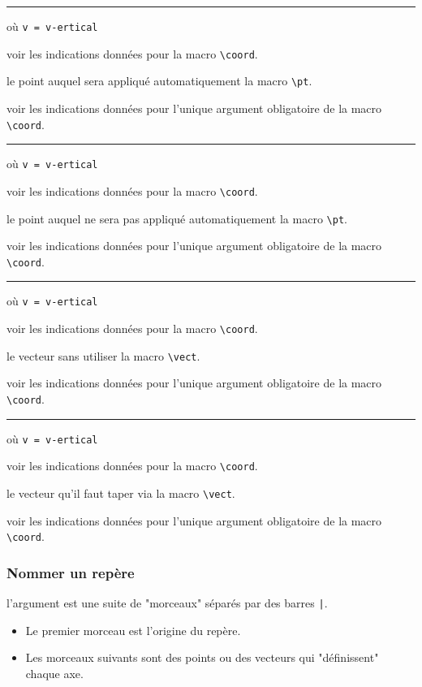 \documentclass[12pt,a4paper]{article}
\newcommand\env[1]{\texttt{#1}}
\newcommand\macro[1]{\env{\textbackslash{}#1}}
\theoremstyle{definition}
\newcommand\separation{
	\medskip
	\hfill\rule{0.5\textwidth}{0.75pt}\hfill
	\medskip
}
\newcommand\mwhyprefix[2]{%
	\texttt{#1 = #1-#2}%
}
\begin{document}
\separation


 où \quad \mwhyprefix{v}{ertical}

\IDoption{} voir les indications données pour la macro \macro{coord}.

 le point auquel sera appliqué automatiquement la macro \macro{pt}.

 voir les indications données pour l'unique argument obligatoire de la macro \macro{coord}.


\separation


 où \quad \mwhyprefix{v}{ertical}

\IDoption{} voir les indications données pour la macro \macro{coord}.

 le point auquel ne sera pas appliqué automatiquement la macro \macro{pt}.

 voir les indications données pour l'unique argument obligatoire de la macro \macro{coord}.


\separation


 où \quad \mwhyprefix{v}{ertical}

\IDoption{} voir les indications données pour la macro \macro{coord}.

 le vecteur sans utiliser la macro \macro{vect}.

 voir les indications données pour l'unique argument obligatoire de la macro \macro{coord}.


\separation


 où \quad \mwhyprefix{v}{ertical}

\IDoption{} voir les indications données pour la macro \macro{coord}.

 le vecteur qu'il faut taper via la macro \macro{vect}.

 voir les indications données pour l'unique argument obligatoire de la macro \macro{coord}.
\subsubsection{Nommer un repère}



\IDarg{} l'argument est une suite de "morceaux" séparés par des barres \verb+|+.

\begin{itemize}[topsep=0pt]
	\item Le premier morceau est l'origine du repère.

	\item Les morceaux suivants sont des points ou des vecteurs qui "définissent" chaque axe.
\end{itemize}
\end{document}

